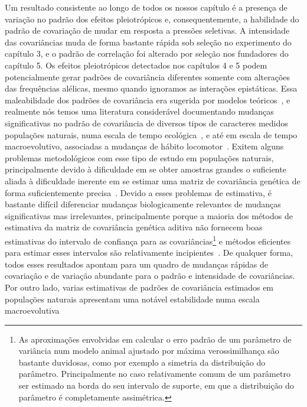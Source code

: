 \begin{refsection}
Um resultado consistente ao longo de todos os nossos capítulo é a presença de
variação no padrão dos efeitos pleiotrópicos e, consequentemente, a habilidade
do padrão de covariação de mudar em resposta a pressões seletivas. A
intensidade das covariâncias muda de forma bastante rápida sob seleção no
experimento do capítulo 3, e o padrão de correlação foi alterado por seleção
nos fundadores do capítulo 5. Os efeitos pleiotrópicos detectados nos
capítulos 4 e 5 podem potencialmente gerar padrões de covariância diferentes
somente com alterações das frequências alélicas, mesmo quando ignoramos as
interações epistáticas. Essa maleabilidade dos padrões de covariância era
sugerida por modelos teóricos~\parencite{Barton1989-ag, Arnold2008-pc}, e
realmente nós temos uma literatura considerável documentando mudanças
significativas no padrão de covariância de diversos tipos de caracteres
medidos populações naturais, numa escala de tempo
ecológica~\parencite{Merila1996-rw, Doroszuk2008-qe, Bjorklund2013-io,
Pfrender2000-if, Eroukhmanoff2011-ph}, e até em escala de tempo
macroevolutivo, associadas a mudanças de hábito
locomotor~\parencite{Young2005-nk, Young2010-rm}. Exitem alguns problemas
metodológicos com esse tipo de estudo em populações naturais, principalmente
devido à dificuldade em se obter amostras grandes o suficiente aliada à
dificuldade inerente em se estimar uma matriz de covariância genética de forma
suficientemente precisa~\parencite{Marroig2012-jd}. Devido a esses problemas
de estimativa, é bastante difícil diferenciar mudanças biologicamente
relevantes de mudanças significativas mas irrelevantes, principalmente porque
a maioria dos métodos de estimativa da matriz de covariância genética aditiva
não fornecem boas estimativas do intervalo de confiança para as
covariâncias\footnote{As aproximações envolvidas em calcular o erro padrão de
um parâmetro de variância num modelo animal ajustado por máxima
verossimilhança são bastante duvidosas, como por exemplo a simetria da
distribuição do parâmetro. Principalmente no caso relativamente comum de um
parâmetro ser estimado na borda do seu intervalo de suporte, em que a
distribuição do parâmetro é completamente assimétrica.} e métodos eficientes
para estimar esses intervalos são relativamente
incipientes~\parencite{Houle2015-jb, Runcie2013-nr}. De qualquer forma, todos
esses resultados apontam para um quadro de mudanças rápidas de covariação e de
variação abundante para o padrão e intensidade de covariâncias. Por outro
lado, varias estimativas de padrões de covariância estimados em populações
naturais apresentam uma notável estabilidade numa escala macroevolutiva

\end{refsection}
